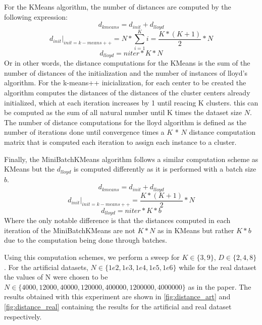 For the KMeans algorithm, the number of distances are computed by the following expression:
$$d_{kmeans} = d_{init} + d_{lloyd}$$
$$d_{init} \bigg\rvert_{init=k-means++} = N * \sum_{i=1}^K i = \frac{K*(K+1)}{2} * N$$
$$d_{lloyd} = niter * K * N$$
Or in other words, the distance computations for the KMeans is the sum of the number of distances of the initialization and the number of instances of lloyd's algorithm. For the k-means++ inicialization, for each center to be created the algorithm computes the distances of the distances of the cluster centers already initialized, which at each iteration increases by 1 until reacing K clusters. this can be computed as the sum of all natural number until K times the dataset size $N$. The number of distance computations for the lloyd algorithm is defined as the number of iterations done until convergence times a $K$ * $N$ distance computation matrix that is computed each iteration to assign each instance to a cluster.

Finally, the MiniBatchKMeans algorithm follows a similar computation scheme as KMeans but the $d_{lloyd}$ is computed differently as it is performed with a batch size $b$.
$$d_{kmeans} = d_{init} + d_{lloyd}$$
$$d_{init} \bigg\rvert_{init=k-means++} = \frac{K*(K+1)}{2} * N$$
$$d_{lloyd} = niter * K * b$$
Where the only notable difference is that the distances computed in each iteration of the MiniBatchKMeans are not $K*N$ as in KMeans but rather $K*b$ due to the computation being done through batches.

Using this computation schemes, we perform a sweep for $K \in \{3, 9\}$, $D \in \{2, 4, 8\}$. For the artificial datasets, $N \in \{1e2, 1e3, 1e4, 1e5, 1e6\}$ while for the real dataset the values of N were chosen to be $N \in \{4000, 12000, 40000, 120000, 400000, 1200000, 4000000\}$ as in the paper. The results obtained with this experiment are shown in \ref{fig:distance_art} and \ref{fig:distance_real} containing the results for the artificial and real dataset respectively.

